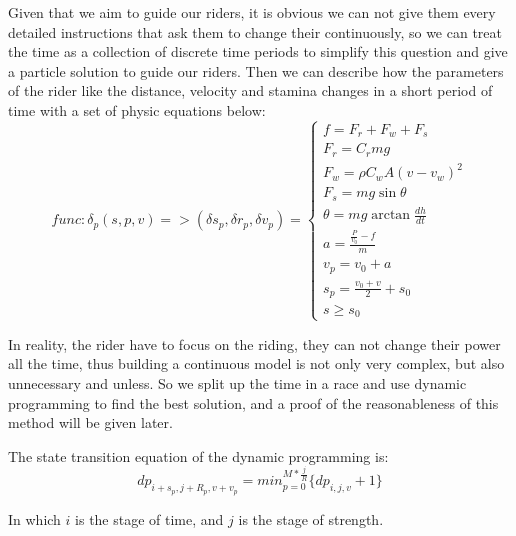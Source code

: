 \documentclass[12pt]{article}
\begin{document}
Given that we aim to guide our riders, it is obvious we can not give them every detailed instructions that ask them to change their continuously, so we can treat the time 
as a collection of discrete time periods to simplify this question and give a particle solution to guide our riders.
Then we can describe how the parameters of the rider like the distance, velocity and stamina changes in a short period of time with a set of physic equations below:
\begin{equation}
    func: \delta_p(s,p,v)=>(\delta s_p,\delta r_p,\delta v_p)=\left\{
    \begin{array}{c}
        f=F_r+F_w+F_s                   \\
        F_r=C_rmg                       \\
        F_w=\rho C_w A(v-v_w)^2         \\
        F_s=mg\sin \theta               \\
        \theta=mg\arctan\frac{d h}{d t} \\
        a=\frac{\frac{P}{v_0}-f}{m}     \\
        v_p=v_0+a                       \\
        s_p=\frac{v_0+v}{2}+s_0         \\
        s\geqslant s_0
    \end{array}
    \right.
\end{equation}

In reality, the rider have to focus on the riding, they can not change their power all the time, thus building a continuous model is not only very complex,
but also unnecessary and unless. So we split up the time in a race and use dynamic programming to find the best solution,
and a proof of the reasonableness of this method will be given later.

The state transition equation of the dynamic programming is:$$dp_{i+s_p,j+R_p,v+v_p}= min_{p = 0}^{M*\frac{j}{R}}\{dp_{i,j,v}+1\}$$

In which $i$ is the stage of time, and $j$ is the stage of strength.
\end{document}
